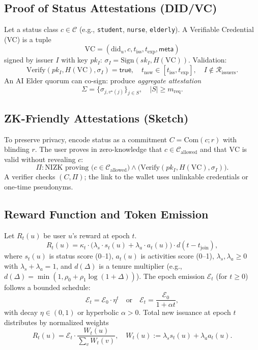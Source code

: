 \documentclass[11pt,a4paper]{article}
\begin{document}
\subsection{Proof of Status Attestations (DID/VC)}
Let a status class $c\in \mathcal{C}$ (e.g., \texttt{student}, \texttt{nurse}, \texttt{elderly}). A Verifiable Credential (VC) is a tuple
\[
\mathrm{VC} = (\mathrm{did}_u, c, t_{\mathrm{iss}}, t_{\mathrm{exp}}, \mathsf{meta})
\]
signed by issuer $I$ with key $pk_I$: $\sigma_I=\mathrm{Sign}(sk_I,H(\mathrm{VC}))$. Validation:
\[
\mathrm{Verify}(pk_I, H(\mathrm{VC}), \sigma_I)=\textsf{true},\quad t_{\mathrm{now}}\in [t_{\mathrm{iss}}, t_{\mathrm{exp}}],\quad I\notin \mathcal{R}_{\text{issuers}}.
\]
An AI Elder quorum can co-sign: produce \emph{aggregate attestation}
\[
\Sigma = \{\sigma_{j,v^\star(j)}\}_{j\in S},\quad |S|\ge m_{\mathrm{req}}.
\]

\subsection{ZK-Friendly Attestations (Sketch)}
To preserve privacy, encode status as a commitment $C = \mathrm{Com}(c; r)$ with blinding $r$. The user proves in zero-knowledge that $c\in \mathcal{C}_{\text{allowed}}$ and that $\mathrm{VC}$ is valid without revealing $c$:
\[
\Pi : \text{NIZK proving } \big(c\in \mathcal{C}_{\text{allowed}}\big)\wedge \big(\mathrm{Verify}(pk_I,H(\mathrm{VC}),\sigma_I)\big).
\]
A verifier checks $(C,\Pi)$; the link to the wallet uses unlinkable credentials or one-time pseudonyms.

\subsection{Reward Function and Token Emission}
Let $R_t(u)$ be user $u$'s reward at epoch $t$.
\[
R_t(u) = \kappa_t \cdot \Big(\lambda_s \cdot s_t(u) + \lambda_a \cdot a_t(u)\Big)\cdot d(t-t_{\mathrm{join}}),
\]
where $s_t(u)$ is status score (0--1), $a_t(u)$ is activities score (0--1), $\lambda_s,\lambda_a\ge 0$ with $\lambda_s+\lambda_a=1$, and $d(\Delta)$ is a tenure multiplier (e.g., $d(\Delta)=\min(1,\rho_0+\rho_1\log(1+\Delta))$).
The epoch emission $\mathcal{E}_t$ (for $t\ge 0$) follows a bounded schedule:
\[
\mathcal{E}_t = \mathcal{E}_0 \cdot \eta^t \quad \text{or} \quad \mathcal{E}_t = \frac{\mathcal{E}_0}{1+\alpha t},
\]
with decay $\eta\in(0,1)$ or hyperbolic $\alpha>0$. Total new issuance at epoch $t$ distributes by normalized weights
\[
R_t(u) = \mathcal{E}_t \cdot \frac{W_t(u)}{\sum_{v} W_t(v)},\quad W_t(u) := \lambda_s s_t(u)+\lambda_a a_t(u).
\]
\end{document}
